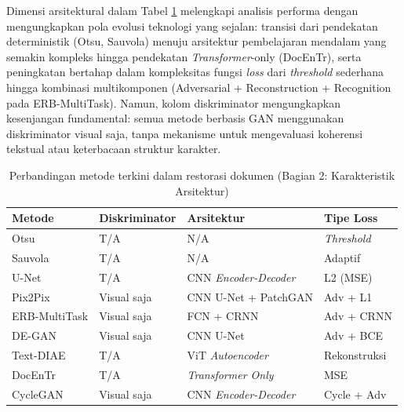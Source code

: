 Dimensi arsitektural dalam Tabel \ref{tab:sota-comparison-arch} melengkapi analisis performa dengan mengungkapkan pola evolusi teknologi yang sejalan: transisi dari pendekatan deterministik (Otsu, Sauvola) menuju arsitektur pembelajaran mendalam yang semakin kompleks hingga pendekatan \textit{Transformer}-only (DocEnTr), serta peningkatan bertahap dalam kompleksitas fungsi \textit{loss} dari \textit{threshold} sederhana hingga kombinasi multikomponen (Adversarial + Reconstruction + Recognition pada ERB-MultiTask). Namun, kolom diskriminator mengungkapkan kesenjangan fundamental: semua metode berbasis GAN menggunakan diskriminator visual saja, tanpa mekanisme untuk mengevaluasi koherensi tekstual atau keterbacaan struktur karakter.

\begin{table}[htbp]
      \centering
      \caption[Perbandingan Metode Restorasi (Karakteristik Arsitektur)]{Perbandingan metode terkini dalam restorasi dokumen (Bagian 2: Karakteristik Arsitektur)}
      \label{tab:sota-comparison-arch}
      \footnotesize
            \begin{tabularx}{\textwidth}{|>{\raggedright\arraybackslash}X|>{\centering\arraybackslash}p{2.3cm}|>{\raggedright\arraybackslash}X|>{\centering\arraybackslash}p{2.2cm}|}
                  \hline
                  \textbf{Metode} & \textbf{Diskriminator} & \textbf{Arsitektur} & \textbf{Tipe Loss} \\ \hline
                  Otsu \parencite{otsu1979}          & T/A                    & N/A                  & \textit{Threshold}          \\ \hline
                  Sauvola \parencite{sauvola2000}    & T/A                    & N/A                  & Adaptif            \\ \hline
                  U-Net \parencite{ronneberger2015}           & T/A                    & CNN \textit{Encoder-Decoder}  & L2 (MSE)           \\ \hline
                  Pix2Pix \parencite{isola2017}      & Visual saja            & CNN U-Net + PatchGAN & Adv + L1           \\ \hline
                  ERB-MultiTask \parencite{erb2021}           & Visual saja            & FCN + CRNN           & Adv + CRNN         \\ \hline
                  DE-GAN \parencite{souibgui2021}             & Visual saja            & CNN U-Net            & Adv + BCE          \\ \hline
                  Text-DIAE \parencite{textdiae2022} & T/A                    & ViT \textit{Autoencoder}      & Rekonstruksi       \\ \hline
                  DocEnTr \parencite{docentr2022}    & T/A                    & \textit{Transformer Only}     & MSE                \\ \hline
                  CycleGAN \parencite{zhu2017}       & Visual saja            & CNN \textit{Encoder-Decoder}  & Cycle + Adv        \\ \hline
            \end{tabularx}


\end{table}
